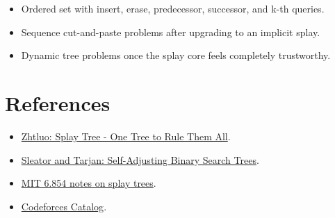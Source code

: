 \begin{itemize}
  \item Ordered set with insert, erase, predecessor, successor, and k-th queries.
  \item Sequence cut-and-paste problems after upgrading to an implicit splay.
  \item Dynamic tree problems once the splay core feels completely trustworthy.
\end{itemize}

\section*{References}

\begin{itemize}
  \item \href{https://zhtluo.com/cp/splay-tree-one-tree-to-rule-them-all.html}{Zhtluo: Splay Tree - One Tree to Rule Them All}.
  \item \href{https://www.cs.princeton.edu/courses/archive/fall02/cs521/ST85.pdf}{Sleator and Tarjan: Self-Adjusting Binary Search Trees}.
  \item \href{https://ocw.mit.edu/courses/6-854j-advanced-algorithms-fall-2005/cfaa2099f5edb14d32d93998efd87fc1_n3_splay.pdf}{MIT 6.854 notes on splay trees}.
  \item \href{https://codeforces.com/catalog}{Codeforces Catalog}.
\end{itemize}
